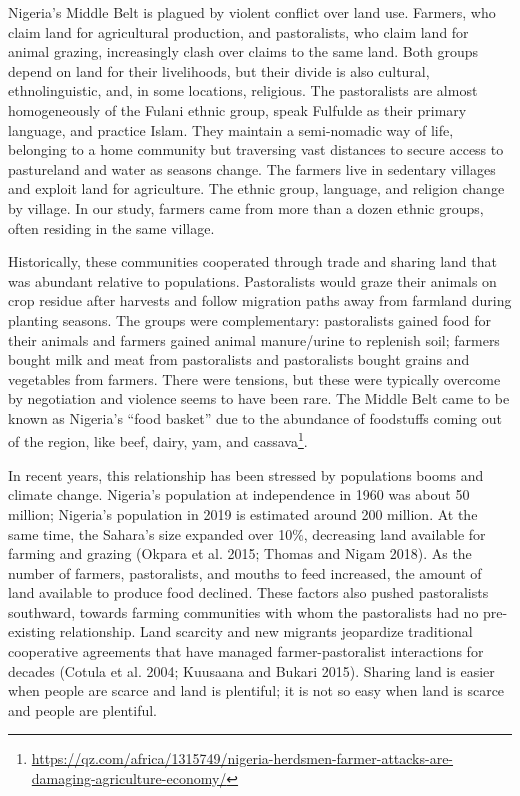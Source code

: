 \documentclass[11pt]{article}
\begin{document}
Nigeria's Middle Belt is plagued by violent conflict over land use.
Farmers, who claim land for agricultural production, and pastoralists,
who claim land for animal grazing, increasingly clash over claims to the
same land. Both groups depend on land for their livelihoods, but their
divide is also cultural, ethnolinguistic, and, in some locations,
religious. The pastoralists are almost homogeneously of the Fulani
ethnic group, speak Fulfulde as their primary language, and practice
Islam. They maintain a semi-nomadic way of life, belonging to a home
community but traversing vast distances to secure access to pastureland
and water as seasons change. The farmers live in sedentary villages and
exploit land for agriculture. The ethnic group, language, and religion
change by village. In our study, farmers came from more than a dozen
ethnic groups, often residing in the same village.

Historically, these communities cooperated through trade and sharing
land that was abundant relative to populations. Pastoralists would graze
their animals on crop residue after harvests and follow migration paths
away from farmland during planting seasons. The groups were
complementary: pastoralists gained food for their animals and farmers
gained animal manure/urine to replenish soil; farmers bought milk and
meat from pastoralists and pastoralists bought grains and vegetables
from farmers. There were tensions, but these were typically overcome by
negotiation and violence seems to have been rare. The Middle Belt came
to be known as Nigeria's ``food basket'' due to the abundance of
foodstuffs coming out of the region, like beef, dairy, yam, and
cassava\footnote{\url{https://qz.com/africa/1315749/nigeria-herdsmen-farmer-attacks-are-damaging-agriculture-economy/}}.

In recent years, this relationship has been stressed by populations
booms and climate change. Nigeria's population at independence in 1960
was about 50 million; Nigeria's population in 2019 is estimated around
200 million. At the same time, the Sahara's size expanded over 10\%,
decreasing land available for farming and grazing (Okpara et al. 2015;
Thomas and Nigam 2018). As the number of farmers, pastoralists, and
mouths to feed increased, the amount of land available to produce food
declined. These factors also pushed pastoralists southward, towards
farming communities with whom the pastoralists had no pre-existing
relationship. Land scarcity and new migrants jeopardize traditional
cooperative agreements that have managed farmer-pastoralist interactions
for decades (Cotula et al. 2004; Kuusaana and Bukari 2015). Sharing land
is easier when people are scarce and land is plentiful; it is not so
easy when land is scarce and people are plentiful.
\end{document}

